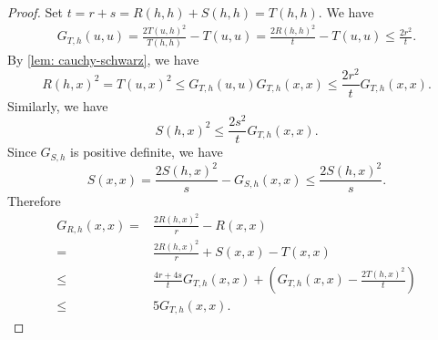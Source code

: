 \begin{proof}
    Set $t=r+s=R(h,h)+S(h,h)=T(h,h)$. We have
    \begin{align*}
        G_{T,h}(u,u)=\frac{2T(u,h)^2}{T(h,h)}-T(u,u)=\frac{2R(h,h)^2}{t}-T(u,u)\leq \frac{2 r^2}{t}.
    \end{align*}
    By \cref{lem: cauchy-schwarz}, we have
    \[
        R(h,x)^2=T(u,x)^2\leq G_{T,h}(u,u)G_{T,h}(x,x)\leq \frac{2r^2}{t}G_{T,h}(x,x).
    \]
    Similarly, we have
    \[
        S(h,x)^2\leq \frac{2s^2}{t}G_{T,h}(x,x) .
    \]
    Since $G_{S,h}$ is positive definite, we have
    \[
        S(x,x)=\frac{2S(h,x)^2}{s}-G_{S,h}(x,x)\leq \frac{2S(h,x)^2}{s}.
    \]
    Therefore
    \begin{align*}
        G_{R,h}(x,x)=&\frac{2R(h,x)^2}{r}-R(x,x)\\
        =&\frac{2R(h,x)^2}{r}+S(x,x)-T(x,x)\\
        \leq&\frac{4r+4s}{t}G_{T,h}(x,x)+\left(G_{T,h}(x,x)-\frac{2T(h,x)^2}{t}\right)\\
        \leq& 5G_{T,h}(x,x).
    \end{align*}
\end{proof}
